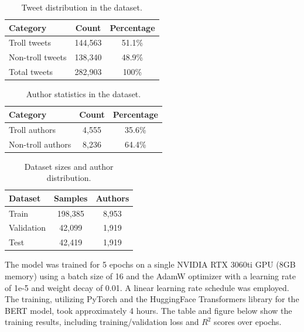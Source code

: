 \documentclass[twoside]{ctuthesis}
\theoremstyle{plain}
\theoremstyle{definition}
\theoremstyle{note}
\begin{document}
\begin{table}[ht]
    \centering
    \caption{Tweet distribution in the dataset.}
    \label{tab:tweet_distribution}
    \begin{tabular}{lcc}
        \toprule
        \textbf{Category} & \textbf{Count} & \textbf{Percentage} \\
        \midrule
        Troll tweets     & 144,563 & 51.1\% \\
        Non-troll tweets & 138,340 & 48.9\% \\
        \midrule
        Total tweets     & 282,903 & 100\% \\
        \bottomrule
    \end{tabular}
\end{table}

\begin{table}[ht]
    \centering
    \caption{Author statistics in the dataset.}
    \label{tab:author_statistics}
    \begin{tabular}{lcc}
        \toprule
        \textbf{Category} & \textbf{Count} & \textbf{Percentage} \\
        \midrule
        Troll authors     & 4,555 & 35.6\% \\
        Non-troll authors & 8,236 & 64.4\% \\
        \bottomrule
    \end{tabular}
\end{table}


\begin{table}[ht]
    \centering
    \caption{Dataset sizes and author distribution.}
    \label{tab:dataset_sizes}
    \begin{tabular}{lcc}
        \toprule
        \textbf{Dataset} & \textbf{Samples} & \textbf{Authors} \\
        \midrule
        Train       & 198,385 & 8,953 \\
        Validation  & 42,099  & 1,919 \\
        Test        & 42,419  & 1,919 \\
        \bottomrule
    \end{tabular}
\end{table}

The model was trained for 5 epochs on a single NVIDIA RTX 3060ti GPU (8GB memory) using a batch size of 16 and the AdamW optimizer with a learning rate of 1e-5 and weight decay of 0.01. A linear learning rate schedule was employed. The training, utilizing PyTorch and the HuggingFace Transformers library for the BERT model, took approximately 4 hours. The table and figure below show the training results, including training/validation loss and $R^2$ scores over epochs.\par
\end{document}
